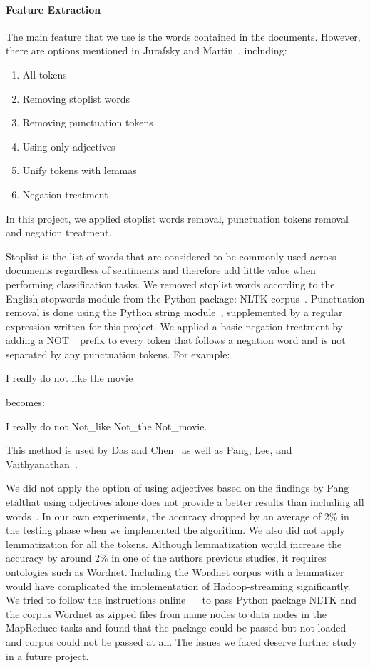 \paragraph{Feature Extraction}
The main feature that we use is the words contained in the documents.
However, there are options mentioned in Jurafsky and
Martin~\cite{hid-sp18-405-sentiment-jurafsky2009}, including:
\begin{enumerate}
	\item All tokens
	\item Removing stoplist words
	\item Removing punctuation tokens
	\item Using only adjectives
	\item Unify tokens with lemmas
	\item Negation treatment
\end{enumerate}
In this project, we applied stoplist words removal, punctuation tokens 
removal and negation treatment. 

Stoplist is the list of words that are considered to be commonly used
across documents regardless of sentiments and therefore add little
value when performing classification tasks. We removed stoplist words
according to the English stopwords module from the Python package:
NLTK corpus~\cite{hid-sp18-405-sentiment-stopworddoc}. Punctuation
removal is done using the Python string
module~\cite{hid-sp18-405-sentiment-punctuationdoc}, supplemented by a
regular expression written for this project. We applied a basic
negation treatment by adding a NOT\_ prefix to every token that
follows a negation word and is not separated by any punctuation
tokens. For example:

I really do not like the movie

becomes:

I really do not Not\_like Not\_the Not\_movie.

This method is used by Das and
Chen~\cite{hid-sp18-405-sentiment-das2001yahoo} as well as Pang, Lee,
and Vaithyanathan~\cite{hid-sp18-405-sentiment-pang2002thumbs}.

We did not apply the option of using adjectives based on the findings
by Pang et\. al\. that using adjectives alone does not provide a better
results than including all
words~\cite{hid-sp18-405-sentiment-pang2004asentimental}. In our own
experiments, the accuracy dropped by an average of 2\% in the testing
phase when we implemented the algorithm. We also did not apply
lemmatization for all the tokens. Although lemmatization would
increase the accuracy by around 2\% in one of the authors previous
studies, it requires ontologies such as Wordnet. Including the Wordnet
corpus with a lemmatizer would have complicated the implementation of
Hadoop-streaming significantly. We tried to follow the instructions
online~\cite{hid-sp18-405-hadoopstreaming-nltk}
~\cite{hid-sp18-405-hadoopstreaming-corpus}
to pass Python package NLTK and the corpus Wordnet as zipped files
from name nodes to data nodes in the MapReduce tasks and found that
the package could be passed but not loaded and corpus could not be
passed at all. The issues we faced deserve further study in a future
project.

